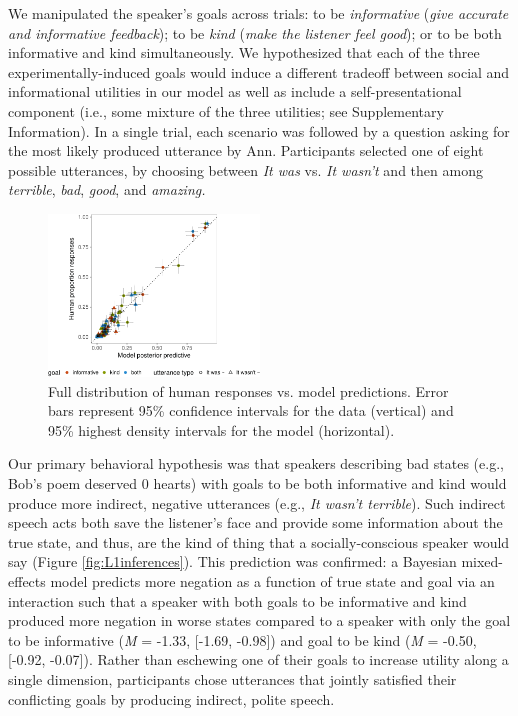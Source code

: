 \documentclass[9pt,twocolumn,twoside,lineno]{main_class_file}
\begin{document}
We manipulated the speaker's goals across trials: to be
\emph{informative} (\emph{give accurate and informative feedback});
to be \emph{kind} (\emph{make the listener feel good}); or to be
both informative and kind simultaneously. We hypothesized that
each of the three experimentally-induced goals would induce a different tradeoff between social and informational
utilities in our model as well as include a self-presentational component (i.e., some mixture of the three utilities; see Supplementary Information). In a single
trial, each scenario was followed by a question asking for the most
likely produced utterance by Ann. Participants selected one of eight possible
utterances, by choosing between \emph{It was} vs. \emph{It wasn't} and
then among \emph{terrible}, \emph{bad}, \emph{good}, and \emph{amazing.}

\begin{figure}[!h]
\includegraphics[width=0.5\textwidth]{fig/variance-1} \caption{Full distribution of human responses vs. model predictions. Error bars represent 95\% confidence intervals for the data (vertical) and 95\% highest density intervals for the model (horizontal).}\label{fig:variance}
\end{figure}

Our primary behavioral hypothesis was that speakers describing bad
states (e.g., Bob's poem deserved 0 hearts) with goals to be both
informative and kind would produce more indirect, negative utterances
(e.g., \emph{It wasn't terrible}). Such indirect speech acts both
save the listener's face and provide some information about the
true state, and thus, are the kind of thing that a socially-conscious speaker would say (Figure \ref{fig:L1inferences}).
This prediction was confirmed: a Bayesian mixed-effects
model predicts more negation as a function of true state and goal via
an interaction such that a speaker with both goals to be informative and
kind produced more negation in worse states compared to a speaker with
only the goal to be informative (\emph{M} = -1.33, {[}-1.69, -0.98{]})
and goal to be kind (\emph{M} = -0.50, {[}-0.92, -0.07{]}). Rather than
eschewing one of their goals to increase utility along a single
dimension, participants chose utterances that jointly satisfied their
conflicting goals by producing indirect, polite speech.
\end{document}
